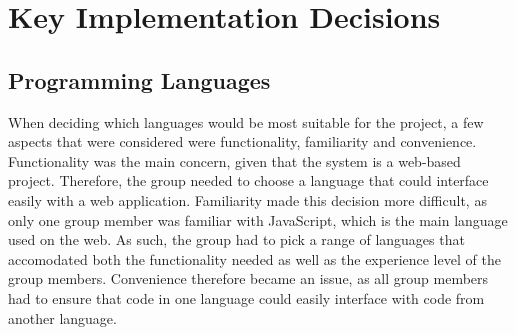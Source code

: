 \documentclass[a4paper,titlepage]{article}
\begin{document}
\section{Key Implementation Decisions}
\subsection{Programming Languages}
When deciding which languages would be most suitable for the project, a few aspects that were considered were functionality, familiarity  and convenience.
Functionality was the main concern, given that the system is a web-based project.
Therefore, the group needed to choose a language that could interface easily with a web application.
Familiarity made this decision more difficult, as only one group member was familiar with JavaScript, which is the main language used on the web.
As such, the group had to pick a range of languages that accomodated both the functionality needed as well as the experience level of the group members.
Convenience therefore became an issue, as all group members had to ensure that code in one language could easily interface with code from another language.
\end{document}
